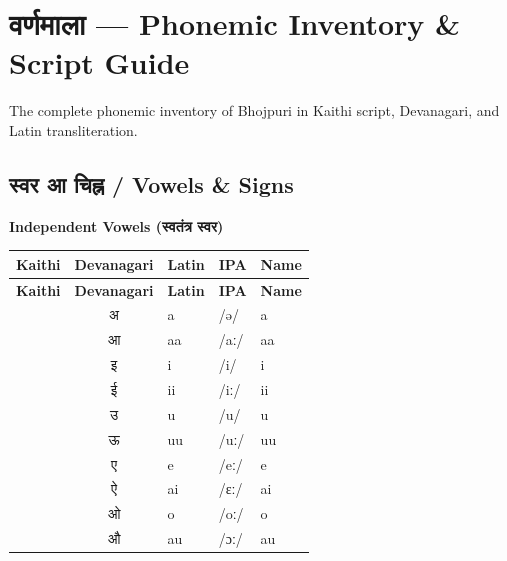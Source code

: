 \section*{वर्णमाला --- Phonemic Inventory \& Script Guide}
\vspace{0.2em}
{\small\color{bpgray}The complete phonemic inventory of Bhojpuri in Kaithi script, Devanagari, and Latin transliteration.}
\vspace{0.4em}

\subsection*{\color{bpblue}स्वर आ चिह्न / Vowels \& Signs}

{\bfseries\small Independent Vowels (स्वतंत्र स्वर)}
\renewcommand{\arraystretch}{1.15}
\begin{longtable}{@{} c c l l l @{}}
\toprule
\textbf{Kaithi} & \textbf{Devanagari} & \textbf{Latin} & \textbf{IPA} & \textbf{Name} \\
\midrule
\endfirsthead
\toprule
\textbf{Kaithi} & \textbf{Devanagari} & \textbf{Latin} & \textbf{IPA} & \textbf{Name} \\
\midrule
\endhead
\bottomrule
\endfoot

\K{\ba} & अ & a & /ə/ & a \\
\K{\baa} & आ & aa & /aː/ & aa \\
\K{\bi} & इ & i & /i/ & i \\
\K{\bii} & ई & ii & /iː/ & ii \\
\K{\bu} & उ & u & /u/ & u \\
\K{\buu} & ऊ & uu & /uː/ & uu \\
\K{\be} & ए & e & /eː/ & e \\
\K{\bai} & ऐ & ai & /ɛː/ & ai \\
\K{\bo} & ओ & o & /oː/ & o \\
\K{\bau} & औ & au & /ɔː/ & au \\
\bottomrule
\end{longtable}

\vspace{0.3em}

